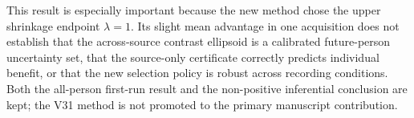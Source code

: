 This result is especially important because the new method
chose the upper shrinkage endpoint $\lambda=1$.
Its slight mean advantage in one acquisition does not establish
that the across-source contrast ellipsoid is a calibrated
future-person uncertainty set, that the source-only certificate
correctly predicts individual benefit, or that the new
selection policy is robust across recording conditions.
Both the all-person first-run result and the non-positive
inferential conclusion are kept; the V31 method is not promoted
to the primary manuscript contribution.
